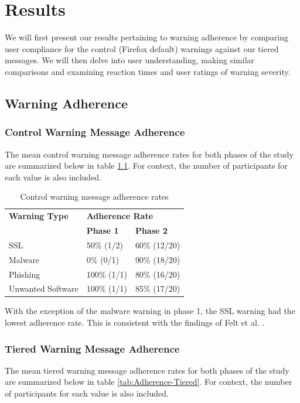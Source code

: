 \chapter{Results}
\label{Results}

We will first present our results pertaining to warning adherence by comparing user compliance for the control (Firefox default) warnings against our tiered messages. We will then delve into user understanding, making similar comparisons and examining reaction times and user ratings of warning severity.


\section{Warning Adherence}
\label{Warning Adherence}
\subsection{Control Warning Message Adherence}
The mean control warning message adherence rates for both phases of the study are summarized below in table \ref{tab:Adherence-Control}. For context, the number of participants for each value is also included. 

{\renewcommand{\arraystretch}{1.2}
\begin{table}[!htb]
	\small
	\centering
	\begin{tabularx}{0.85\textwidth}{|l|X|X|}
		\hline			
		\textbf{Warning Type} & \multicolumn{2}{|X|}{\textbf{Adherence Rate}}\\
		\cline{2-3}
		& \textbf{Phase 1} & \textbf{Phase 2}\\
		\hline
		SSL & 50\% (1/2) & 60\% (12/20)\\
		\hline
		Malware & 0\% (0/1) & 90\% (18/20)\\
		\hline
		Phishing & 100\% (1/1) & 80\% (16/20)\\
		\hline
		Unwanted Software & 100\% (1/1) & 85\% (17/20)\\
		\hline
	\end{tabularx}
	\caption{Control warning message adherence rates}
	\label{tab:Adherence-Control}
\end{table}}

With the exception of the malware warning in phase 1, the SSL warning had the lowest adherence rate. This is consistent with the findings of Felt et al. \cite{felt2015improving}.

\subsection{Tiered Warning Message Adherence}
The mean tiered warning message adherence rates for both phases of the study are summarized below in table \ref{tab:Adherence-Tiered}. For context, the number of participants for each value is also included.

